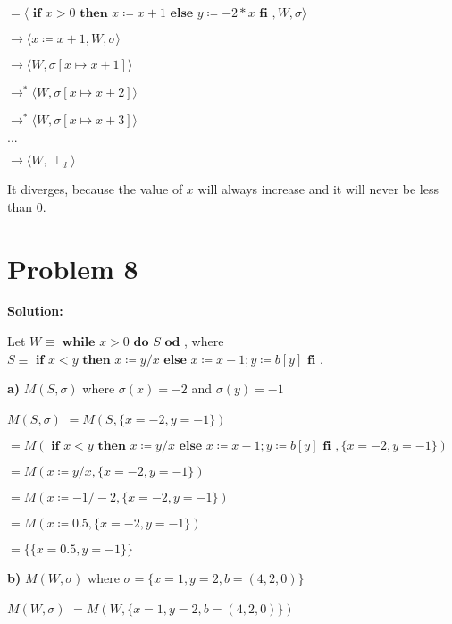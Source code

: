 \documentclass{article}
\begin{document}
\qquad \qquad \qquad \qquad $= \langle \textbf{ if } x>0 \textbf{ then } x \coloneqq x+1 \textbf{ else } y \coloneqq -2*x \textbf{ fi }, W, \sigma \rangle $

\qquad \qquad \qquad \qquad $\rightarrow \langle x \coloneqq x+1, W, \sigma \rangle $

\qquad \qquad \qquad \qquad $\rightarrow \langle W, \sigma[x \mapsto x+1] \rangle $

\qquad \qquad \qquad \qquad $\rightarrow^* \langle W, \sigma[x \mapsto x+2] \rangle $

\qquad \qquad \qquad \qquad $\rightarrow^* \langle W, \sigma[x \mapsto x+3] \rangle $

\qquad \qquad \qquad \qquad $...$

\qquad \qquad \qquad \qquad $\rightarrow \langle W, \perp_d \rangle $

It diverges, because the value of $x$ will always increase and it will never be less than $0$.


\section*{Problem 8}
\textbf{Solution:}

Let $ W \equiv \textbf{ while } x>0 \textbf{ do } S \textbf{ od } $, where $ S \equiv \textbf{ if } x<y \textbf{ then } x \coloneqq y/x \textbf{ else } x \coloneqq x-1; y \coloneqq b[y] \textbf{ fi }$.

\textbf{a)} $M(S,\sigma)$ where $\sigma(x)=-2$ and $\sigma(y)=-1$

\qquad $M(S,\sigma)$ \qquad \qquad $=M(S,\{x=-2,y=-1\})$

\qquad \qquad \qquad \qquad \qquad $=M(\textbf{ if } x<y \textbf{ then } x \coloneqq y/x \textbf{ else } x \coloneqq x-1; y \coloneqq b[y] \textbf{ fi },\{x=-2,y=-1\})$

\qquad \qquad \qquad \qquad \qquad $=M(x \coloneqq y/x,\{x=-2,y=-1\})$

\qquad \qquad \qquad \qquad \qquad $=M(x \coloneqq -1/-2,\{x=-2,y=-1\})$

\qquad \qquad \qquad \qquad \qquad $=M(x \coloneqq 0.5,\{x=-2,y=-1\})$

\qquad \qquad \qquad \qquad \qquad $=\{\{x=0.5,y=-1\}\}$

\vspace{10pt}

\textbf{b)} $M(W,\sigma)$ where $\sigma=\{x=1, y=2,b=(4,2,0)\}$

\qquad $M(W,\sigma)$ \qquad \qquad $=M(W,\{x=1, y=2,b=(4,2,0)\})$
\end{document}
